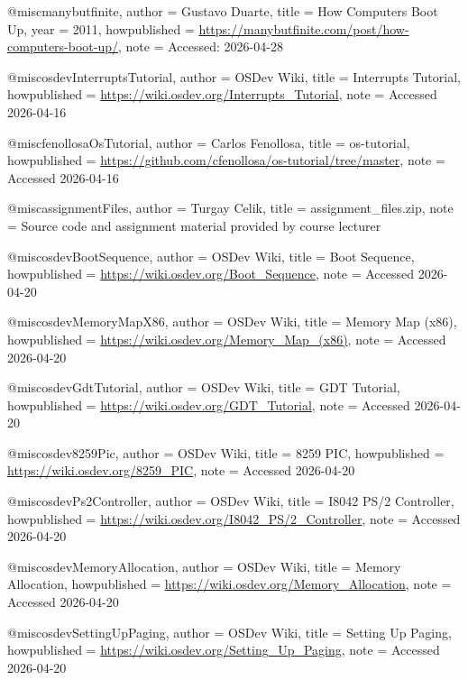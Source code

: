 @misc{manybutfinite,
  author       = {Gustavo Duarte},
  title        = {How Computers Boot Up},
  year         = {2011},
  howpublished = {\url{https://manybutfinite.com/post/how-computers-boot-up/}},
  note         = {Accessed: 2026-04-28}
}

@misc{osdevInterruptsTutorial,
  author       = {{OSDev Wiki}},
  title        = {{Interrupts Tutorial}},
  howpublished = {\url{https://wiki.osdev.org/Interrupts_Tutorial}},
  note         = {Accessed 2026-04-16}
}

@misc{fenollosaOsTutorial,
  author       = {Carlos Fenollosa},
  title        = {{os-tutorial}},
  howpublished = {\url{https://github.com/cfenollosa/os-tutorial/tree/master}},
  note         = {Accessed 2026-04-16}
}

@misc{assignmentFiles,
  author       = {{Turgay Celik}},
  title        = {{assignment\_files.zip}},
  note         = {Source code and assignment material provided by course lecturer}
}

@misc{osdevBootSequence,
  author       = {{OSDev Wiki}},
  title        = {{Boot Sequence}},
  howpublished = {\url{https://wiki.osdev.org/Boot_Sequence}},
  note         = {Accessed 2026-04-20}
}

@misc{osdevMemoryMapX86,
  author       = {{OSDev Wiki}},
  title        = {{Memory Map (x86)}},
  howpublished = {\url{https://wiki.osdev.org/Memory_Map_(x86)}},
  note         = {Accessed 2026-04-20}
}

@misc{osdevGdtTutorial,
  author       = {{OSDev Wiki}},
  title        = {{GDT Tutorial}},
  howpublished = {\url{https://wiki.osdev.org/GDT_Tutorial}},
  note         = {Accessed 2026-04-20}
}

@misc{osdev8259Pic,
  author       = {{OSDev Wiki}},
  title        = {{8259 PIC}},
  howpublished = {\url{https://wiki.osdev.org/8259_PIC}},
  note         = {Accessed 2026-04-20}
}

@misc{osdevPs2Controller,
  author       = {{OSDev Wiki}},
  title        = {{I8042 PS/2 Controller}},
  howpublished = {\url{https://wiki.osdev.org/I8042_PS/2_Controller}},
  note         = {Accessed 2026-04-20}
}

@misc{osdevMemoryAllocation,
  author       = {{OSDev Wiki}},
  title        = {{Memory Allocation}},
  howpublished = {\url{https://wiki.osdev.org/Memory_Allocation}},
  note         = {Accessed 2026-04-20}
}

@misc{osdevSettingUpPaging,
  author       = {{OSDev Wiki}},
  title        = {{Setting Up Paging}},
  howpublished = {\url{https://wiki.osdev.org/Setting_Up_Paging}},
  note         = {Accessed 2026-04-20}
}

